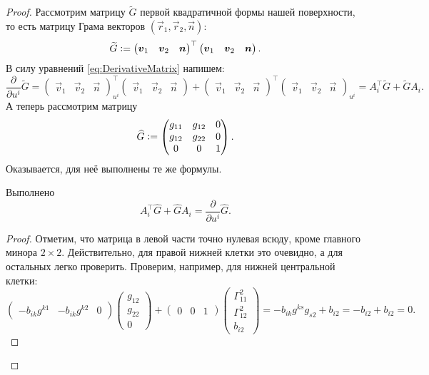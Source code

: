 \begin{proof}
	Рассмотрим матрицу $\widetilde{G}$ первой квадратичной формы нашей поверхности, то есть матрицу Грама векторов $(\vec{r}_1, \vec{r}_2, \vec{n})$:
	\[
		\widetilde{G} \vcentcolon =
		\begin{pmatrix}
			\vec{v}_1 & \vec{v}_2 & \vec{n}
		\end{pmatrix}^\top
		\begin{pmatrix}
			\vec{v}_1 & \vec{v}_2 & \vec{n}
		\end{pmatrix}.
	\]
	В силу уравнений \eqref{eq:DerivativeMatrix} напишем:
	\[
		\frac{\partial}{\partial u^i}\widetilde{G} = 
		\begin{pmatrix}
			\vec{v}_1 & \vec{v}_2 & \vec{n}
		\end{pmatrix}^\top_{u^i}
		\begin{pmatrix}
			\vec{v}_1 & \vec{v}_2 & \vec{n}
		\end{pmatrix} + 
		\begin{pmatrix}
			\vec{v}_1 & \vec{v}_2 & \vec{n}
		\end{pmatrix}^\top
		\begin{pmatrix}
			\vec{v}_1 & \vec{v}_2 & \vec{n}
		\end{pmatrix}_{u^i} = A_i^\top\widetilde{G} + \widetilde{G}A_i.
	\]
	А теперь рассмотрим матрицу
	\[
		\widehat{G} \vcentcolon =
		\begin{pmatrix}
			g_{11} & g_{12} & 0\\
			g_{12} & g_{22} & 0\\
			0 & 0 & 1
		\end{pmatrix}.
	\]
	Оказывается, для неё выполнены те же формулы.

	\begin{lemma} \label{lemma:Gui}
		Выполнено
		\[
			A_i^\top\widehat{G} + \widehat{G}A_i = \frac{\partial}{\partial u^i}\widehat{G}.
		\]
	\end{lemma}

	\begin{proof}
		Отметим, что матрица в левой части точно нулевая всюду, кроме главного минора $2 \times 2$. Действительно, для правой нижней клетки это очевидно, а для остальных легко проверить. Проверим, например, для нижней центральной клетки:
		\[
			\begin{pmatrix}
				-b_{ik}g^{k1} & -b_{ik}g^{k2} & 0
			\end{pmatrix}
			\begin{pmatrix}
				g_{12}\\
				g_{22}\\
				0
			\end{pmatrix} +
			\begin{pmatrix}
				0 & 0 & 1
			\end{pmatrix}
			\begin{pmatrix}
				\Gamma_{11}^2\\
				\Gamma_{12}^2\\
				b_{i2}
			\end{pmatrix} = -b_{ik}g^{ks}g_{s2} + b_{i2} = -b_{i2} + b_{i2} = 0.
		\]
		

\end{proof}
\end{proof}
